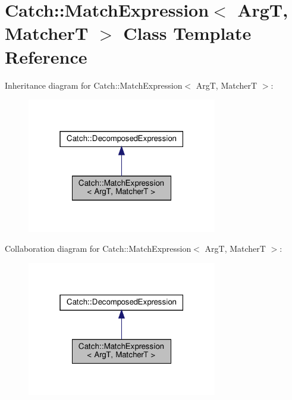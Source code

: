 \hypertarget{classCatch_1_1MatchExpression}{}\section{Catch\+:\+:Match\+Expression$<$ ArgT, MatcherT $>$ Class Template Reference}
\label{classCatch_1_1MatchExpression}


Inheritance diagram for Catch\+:\+:Match\+Expression$<$ ArgT, MatcherT $>$\+:\nopagebreak
\begin{figure}[H]
\begin{center}
\leavevmode
\includegraphics[width=235pt]{classCatch_1_1MatchExpression__inherit__graph}
\end{center}
\end{figure}


Collaboration diagram for Catch\+:\+:Match\+Expression$<$ ArgT, MatcherT $>$\+:\nopagebreak
\begin{figure}[H]
\begin{center}
\leavevmode
\includegraphics[width=235pt]{classCatch_1_1MatchExpression__coll__graph}
\end{center}
\end{figure}
